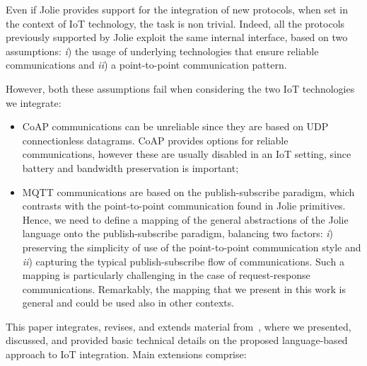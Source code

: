 Even if Jolie provides support for the integration of new protocols, when set
in the context of IoT technology, the task is non trivial. Indeed, all the
protocols previously supported by Jolie exploit the same internal interface,
based on two assumptions: \emph{i}) the usage of underlying technologies that
ensure reliable communications and \emph{ii}) a point-to-point communication
pattern.

However, both these assumptions fail when considering the two IoT technologies
we integrate:

\begin{itemize}
  \item CoAP communications can be unreliable since they are based on UDP
connectionless datagrams. CoAP provides options for reliable communications,
however these are usually disabled in an IoT setting, since battery and
bandwidth preservation is important;

\item MQTT communications are based on the publish-subscribe paradigm, which
contrasts with the point-to-point communication found in Jolie primitives.
Hence, we need to define a mapping of the general abstractions of the Jolie
language onto the publish-subscribe paradigm, balancing two factors: \emph{i})
preserving the simplicity of use of the point-to-point communication style and
\emph{ii}) capturing the typical publish-subscribe flow of communications. Such
a mapping is particularly challenging in the case of request-response
communications. Remarkably, the mapping that we present in this work is general
and could be used also in other contexts.
\end{itemize}

This paper integrates, revises, and extends material
from~\cite{GabbrielliGLZ18}, where we presented, discussed, and provided basic
technical details on the proposed language-based approach to IoT integration.
Main extensions comprise:

